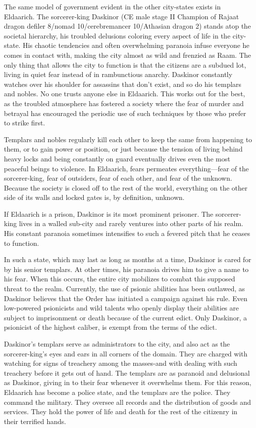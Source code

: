 {
	The same model of government evident in the other city-states exists in Eldaarich. The sorcerer-king Daskinor (CE male stage II Champion of Rajaat dragon defiler 8/nomad 10/cerebremancer 10/Athasian dragon 2) stands atop the societal hierarchy, his troubled delusions coloring every aspect of life in the city-state. His chaotic tendencies and often overwhelming paranoia infuse everyone he comes in contact with, making the city almost as wild and frenzied as Raam. The only thing that allows the city to function is that the citizens are a subdued lot, living in quiet fear instead of in rambunctious anarchy. Daskinor constantly watches over his shoulder for assassins that don't exist, and so do his templars and nobles. No one trusts anyone else in Eldaarich. This works out for the best, as the troubled atmosphere has fostered a society where the fear of murder and betrayal has encouraged the periodic use of such techniques by those who prefer to strike first.

	Templars and nobles regularly kill each other to keep the same from happening to them, or to gain power or position, or just because the tension of living behind heavy locks and being constantly on guard eventually drives even the most peaceful beings to violence. In Eldaarich, fears permeates everything---fear of the sorcerer-king, fear of outsiders, fear of each other, and fear of the unknown. Because the society is closed off to the rest of the world, everything on the other side of its walls and locked gates is, by definition, unknown.

	If Eldaarich is a prison, Daskinor is its most prominent prisoner. The sorcerer-king lives in a walled sub-city and rarely ventures into other parts of his realm. His constant paranoia sometimes intensifies to such a fevered pitch that he ceases to function.

	In such a state, which may last as long as months at a time, Daskinor is cared for by his senior templars. At other times, his paranoia drives him to give a name to his fear. When this occurs, the entire city mobilizes to combat this supposed threat to the realm. Currently, the use of psionic abilities has been outlawed, as Daskinor believes that the Order has initiated a campaign against his rule. Even low-powered psionicists and wild talents who openly display their abilities are subject to imprisonment or death because of the current edict. Only Daskinor, a psionicist of the highest caliber, is exempt from the terms of the edict.

	Daskinor's templars serve as administrators to the city, and also act as the sorcerer-king's eyes and ears in all corners of the domain. They are charged with watching for signs of treachery among the masses-and with dealing with such treachery before it gets out of hand. The templars are as paranoid and delusional as Daskinor, giving in to their fear whenever it overwhelms them. For this reason, Eldaarich has become a police state, and the templars are the police. They command the military. They oversee all records and the distribution of goods and services. They hold the power of life and death for the rest of the citizenry in their terrified hands.
}

